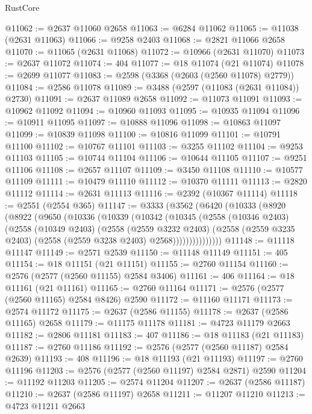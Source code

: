 \begin{lexlean}{RustCore}
\begin{coremodule}
@11062 := @2637 @11060 @2658
@11063 := @6284 @11062
@11065 := @11038 (@2631 @11063)
@11066 := @9258 @2403
@11068 := @2821 @11066 @2658
@11070 := @11065 (@2631 @11068)
@11072 := @10966 (@2631 @11070)
@11073 := @2637 @11072
@11074 := 404
@11077 := @18 @11074 (@21 @11074)
@11078 := @2699 @11077
@11083 := @2598 (@3368 (@2603 (@2560 @11078) @2779))
@11084 := @2586 @11078
@11089 := @3488 (@2597 (@11083 (@2631 @11084)) @2730)
@11091 := @2637 @11089 @2658
@11092 := @11073 @11091
@11093 := @10962 @11092
@11094 := @10960 @11093
@11095 := @10935 @11094
@11096 := @10911 @11095
@11097 := @10888 @11096
@11098 := @10863 @11097
@11099 := @10839 @11098
@11100 := @10816 @11099
@11101 := @10791 @11100
@11102 := @10767 @11101
@11103 := @3255 @11102
@11104 := @9253 @11103
@11105 := @10744 @11104
@11106 := @10644 @11105
@11107 := @9251 @11106
@11108 := @2657 @11107
@11109 := @3450 @11108
@11110 := @10577 @11109
@11111 := @10479 @11110
@11112 := @10370 @11111
@11113 := @2820 @11112
@11114 := @2631 @11113
@11116 := @2392 (@10367 @11114)
@11118 := @2551 (@2554 @365)
@11147 := @3333
    (@3562
      (@6420
        (@10333
          (@8920
            (@8922
              (@9650
                (@10336
                  (@10339
                    (@10342
                      (@10345
                        (@2558
                          (@10346 @2403)
                          (@2558
                            (@10349 @2403)
                            (@2558
                              (@2559 @3232 @2403)
                              (@2558
                                (@2559 @3235 @2403)
                                (@2558 (@2559 @3238 @2403) @2568)))))))))))))))
@11148 := @11118 @11147
@11149 := @2571 @2539
@11150 := @11148 @11149
@11151 := 405
@11154 := @18 @11151 (@21 @11151)
@11155 := @2760 @11154
@11160 := @2576 (@2577 (@2560 @11155) @2584 @3406)
@11161 := 406
@11164 := @18 @11161 (@21 @11161)
@11165 := @2760 @11164
@11171 := @2576 (@2577 (@2560 @11165) @2584 @8426) @2590
@11172 := @11160 @11171
@11173 := @2574 @11172
@11175 := @2637 (@2586 @11155)
@11178 := @2637 (@2586 @11165) @2658
@11179 := @11175 @11178
@11181 := @4723 @11179 @2663
@11182 := @2806 @11181
@11183 := 407
@11186 := @18 @11183 (@21 @11183)
@11187 := @2760 @11186
@11192 := @2576 (@2577 (@2560 @11187) @2584 @2639)
@11193 := 408
@11196 := @18 @11193 (@21 @11193)
@11197 := @2760 @11196
@11203 := @2576 (@2577 (@2560 @11197) @2584 @2871) @2590
@11204 := @11192 @11203
@11205 := @2574 @11204
@11207 := @2637 (@2586 @11187)
@11210 := @2637 (@2586 @11197) @2658
@11211 := @11207 @11210
@11213 := @4723 @11211 @2663

\end{coremodule}
\end{lexlean}
